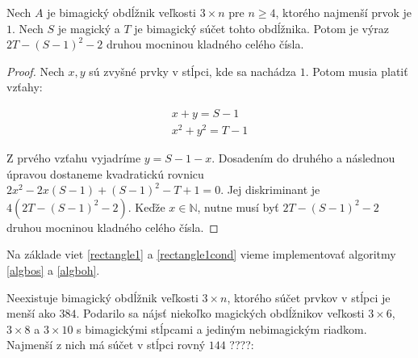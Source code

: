 \begin{theorem} 
\label{rectangle1cond}
Nech $A$ je bimagický obdĺžnik veľkosti $3 \times n$ pre $n \geq 4$, ktorého najmenší prvok je $1$. Nech $S$ je magický a $T$ je bimagický súčet tohto obdĺžnika. Potom je výraz $2T - (S-1)^2 - 2$ druhou mocninou kladného celého čísla.
\end{theorem}

\begin{proof}
Nech $x,y$ sú zvyšné prvky v stĺpci, kde sa nachádza $1$. Potom musia platiť vzťahy:

\begin{gather*}
x + y = S - 1 \\
x^2 + y^2 = T - 1
\end{gather*}

Z prvého vzťahu vyjadríme $y = S - 1 - x$. Dosadením do druhého a následnou úpravou dostaneme kvadratickú rovnicu $2x^2 - 2x(S - 1) + (S - 1)^2 - T + 1 = 0$. Jej diskriminant je $4(2T - (S - 1)^2 - 2)$. Keďže $x \in \mathbb{N}$, nutne musí byť $2T - (S - 1)^2 - 2$ druhou mocninou kladného celého čísla.

\end{proof}



Na základe viet \ref{rectangle1} a \ref{rectangle1cond} vieme implementovať algoritmy \ref{algbos} a \ref{algboh}.

\begin{result} Neexistuje bimagický obdĺžnik veľkosti $3 \times n$, ktorého súčet prvkov v stĺpci je menší ako $384$. Podarilo sa nájsť niekoľko magických obdĺžnikov veľkosti $3 \times 6$, $3 \times 8$ a $3 \times 10$ s bimagickými stĺpcami a jediným nebimagickým riadkom. Najmenší z nich má súčet v stĺpci rovný $144$ ????:
\end{result}


